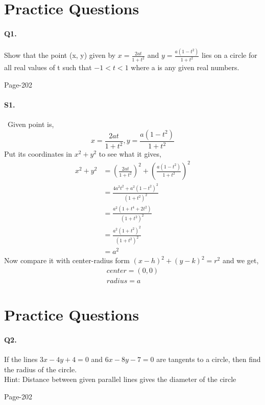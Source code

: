 \documentclass{article}
\begin{document}
\section*{Practice Questions}
\paragraph{Q1.}Show that the point (x, y) given by $x=\frac{2at}{1+t^2}$ and $y=\frac{a(1-t^2)}{1+t^2}$ lies on a circle for all real values of t such that $-1 <  t < 1$ where a is any given real numbers.

\begin{flushright}
Page-202
\end{flushright}
\paragraph{S1.}\
Given point is,
\begin{equation*}
    x=\frac{2at}{1+t^2},y=\frac{a(1-t^2)}{1+t^2}
\end{equation*}
Put its coordinates in $x^2+y^2$ to see what it gives,
\begin{align*}
    x^2+y^2&=\left(\frac{2at}{1+t^2}\right)^2+\left(\frac{a(1-t^2)}{1+t^2}\right)^2\\
    &=\frac{4a^2t^2+a^2(1-t^2)^2}{(1+t^2)^2}\\
    &=\frac{a^2(1+t^4+2t^2)}{(1+t^2)^2}\\
    &=\frac{a^2(1+t^2)^2}{(1+t^2)^2}\\
    &=a^2
\end{align*}
Now compare it with center-radius form $(x-h)^2+(y-k)^2=r^2$ and we get,
\begin{align*}
    center=(0,0)\\
    radius=a
\end{align*}
\clearpage
\section*{Practice Questions}
\paragraph{Q2.}If the lines $3x - 4y + 4 = 0$ and $6x - 8y - 7 = 0$ are tangents to a circle, then find
the radius of the circle.\\
Hint: Distance between given parallel lines gives the diameter of the circle
\begin{flushright}
Page-202
\end{flushright}
\end{document}
